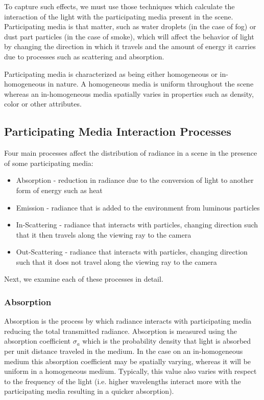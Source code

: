 \documentclass{article}
\begin{document}
To capture such effects, we must use those techniques which calculate the interaction of the light with the participating media present in the scene. Participating media is that matter, such as water droplets (in the case of fog) or dust part particles (in the case of smoke), which will affect the behavior of light by changing the direction in which it travels and the amount of energy it carries due to processes such as scattering and absorption.

Participating media is characterized as being either homogeneous or in-homogeneous in nature. A homogeneous media is uniform throughout the scene whereas an in-homogeneous media spatially varies in properties such as density, color or other attributes.

\subsection{Participating Media Interaction Processes}

Four main processes affect the distribution of radiance in a scene in the presence of some participating media:

\begin{itemize}

\item Absorption - reduction in radiance due to the conversion of light to another form of energy such as heat
\item Emission - radiance that is added to the environment from luminous particles
\item In-Scattering - radiance that interacts with particles, changing direction such that it then travels along the viewing ray to the camera
\item Out-Scattering - radiance that interacts with particles, changing direction such that it does not travel along the viewing ray to the camera

\end{itemize}

Next, we examine each of these processes in detail.

\subsubsection{Absorption}

Absorption is the process by which radiance interacts with participating media reducing the total transmitted radiance. Absorption is measured using the absorption coefficient $\sigma_{a}$ which is the probability density that light is absorbed per unit distance traveled in the medium. In the case on an in-homogeneous medium this absorption coefficient may be spatially varying, whereas it will be uniform in a homogeneous medium. Typically, this value also varies with respect to the frequency of the light (i.e. higher wavelengths interact more with the participating media resulting in a quicker absorption).
\end{document}
